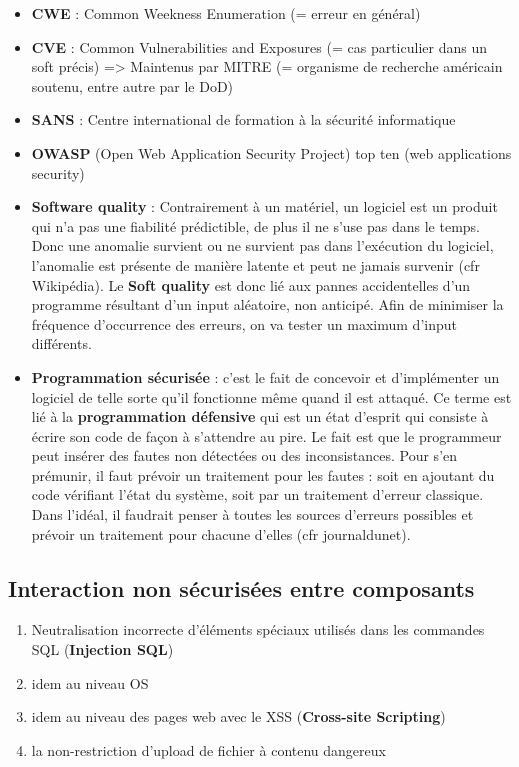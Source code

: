 \documentclass{report}
\begin{document}
\begin{itemize}
    \item \textbf{CWE} : Common Weekness Enumeration (= erreur en général)
    \item \textbf{CVE} : Common Vulnerabilities and Exposures (= cas particulier dans un soft précis)
=> Maintenus par MITRE (= organisme de recherche américain soutenu, entre autre par le DoD)
    \item \textbf{SANS} : Centre international de formation à la sécurité informatique
    \item \textbf{OWASP} (Open Web Application Security Project) top ten (web applications security)
    \item \textbf{Software quality} : Contrairement à un matériel, un logiciel est un produit qui n'a pas une fiabilité prédictible, de plus il ne s'use pas dans le temps. Donc une anomalie survient ou ne survient pas dans l'exécution du logiciel, l'anomalie est présente de manière latente et peut ne jamais survenir (cfr Wikipédia). Le \textbf{Soft quality} est donc lié aux pannes accidentelles d'un programme résultant d'un input aléatoire, non anticipé. Afin de minimiser la fréquence d'occurrence des erreurs, on va tester un maximum d'input différents.
    \item \textbf{Programmation sécurisée} : c'est le fait de concevoir et d’implémenter un logiciel de telle sorte qu’il fonctionne même quand il est attaqué. Ce terme est lié à la \textbf{programmation défensive} qui est un état d'esprit qui consiste à écrire son code de façon à s'attendre au pire. Le fait est que le programmeur peut insérer des fautes non détectées ou des inconsistances. Pour s'en prémunir, il faut prévoir un traitement pour les fautes : soit en ajoutant du code vérifiant l'état du système, soit par un traitement d'erreur classique. Dans l'idéal, il faudrait penser à toutes les sources d'erreurs possibles et prévoir un traitement pour chacune d'elles (cfr journaldunet).

\end{itemize}

\subsection{Interaction non sécurisées entre composants}

\begin{enumerate}
    \item Neutralisation incorrecte d'éléments spéciaux utilisés dans les commandes SQL (\textbf{Injection SQL})
    \item idem au niveau OS
    \item idem au niveau des pages web avec le XSS (\textbf{Cross-site Scripting})
    \item la non-restriction d'upload de fichier à contenu dangereux
\end{enumerate}
\end{document}
